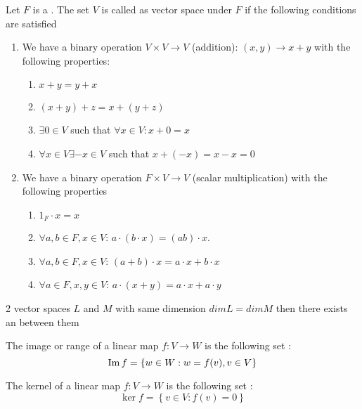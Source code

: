 \begin{appendices}
\begin{definition}
  Let $F$ is a . The set $V$ is called as vector
  space under $F$ if the following conditions are satisfied
  \begin{enumerate}
  \item We have a binary operation $V \times V \rightarrow V$
    (addition): $(x,y) \rightarrow x + y$ with the following
    properties:
    \begin{enumerate}
    \item $x + y = y + x$
    \item $(x + y) + z = x + ( y + z )$
    \item $\exists 0 \in V$ such that $\forall x \in V: x + 0 = x$
    \item $\forall x \in V \exists -x \in V$ such that $x + (-x) = x -
      x = 0$ 
    \end{enumerate}    
  \item We have a binary operation $F \times V \rightarrow V$ (scalar
    multiplication) with the following properties
    \begin{enumerate}
    \item $1_F \cdot x = x$
    \item $\forall a,b \in F, x \in V$: $a\cdot\left(b \cdot x\right)
      = \left(a b\right) \cdot x$.
    \item $\forall a,b \in F, x \in V$:
      $(a+b)\cdot x = a \cdot x + b \cdot x$
    \item $\forall a \in F, x, y \in V$:
      $a\cdot(x+y) = a\cdot x + a \cdot y$
    \end{enumerate}        
  \end{enumerate}
  \label{def:vectorspace}
\end{definition}

\begin{lemma}
  2 vector spaces $L$ and $M$ with same dimension $dim L = dim M$ then
  there exists an  between them
  \label{lem:vsisomorphism}
\end{lemma}

\begin{definition}[Image]
  The image or range of a linear map $f: V \to W$ is the following
  set \cite{wiki:linearmap}:
  \[
  \operatorname{Im} f = \left\{
  w \in W: w = f(v), v \in V
  \right\}
  \]
  \label{def:image}
\end{definition}

\begin{definition}[Kernel]
  The kernel of a linear map $f: V \to W$ is the following
  set \cite{wiki:kernel}:
  \[
  \ker f = \left\{
  v \in V: f(v) = 0
  \right\}
  \]
  \label{def:kernel}
\end{definition}



\end{appendices}
